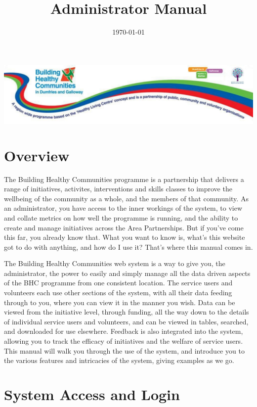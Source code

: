 \documentclass{bhcguides}
\begin{document}
\title{Administrator Manual}
\includegraphics[width=1.0\textwidth]{BHCbanner.png}
\date{\today}
\maketitle

\tableofcontents
\pagebreak

\section{Overview}

The Building Healthy Communities programme is a partnership that delivers a range of initiatives, activites, interventions and skills classes to improve the wellbeing of the community as a whole, and the members of that community. As an administrator, you have access to the inner workings of the system, to view and collate metrics on how well the programme is running, and the ability to create and manage initiatives across the Area Partnerships. But if you've come this far, you already know that. What you want to know is, what's this website got to do with anything, and how do I use it? That's where this manual comes in.

The Building Healthy Communities web system is a way to give you, the administrator, the power to easily and simply manage all the data driven aspects of the BHC programme from one consistent location. The service users and volunteers each use other sections of the system, with all their data feeding through to you, where you can view it in the manner you wish. Data can be viewed from the initiative level, through funding, all the way down to the details of individual service users and volunteers, and can be viewed in tables, searched, and downloaded for use elsewhere. Feedback is also integrated into the system, allowing you to track the efficacy of initiatives and the welfare of service users. This manual will walk you through the use of the system, and introduce you to the various features and intricacies of the system, giving examples as we go.

\pagebreak

\section{System Access and Login}
\label{sec:syslogin}
\end{document}
